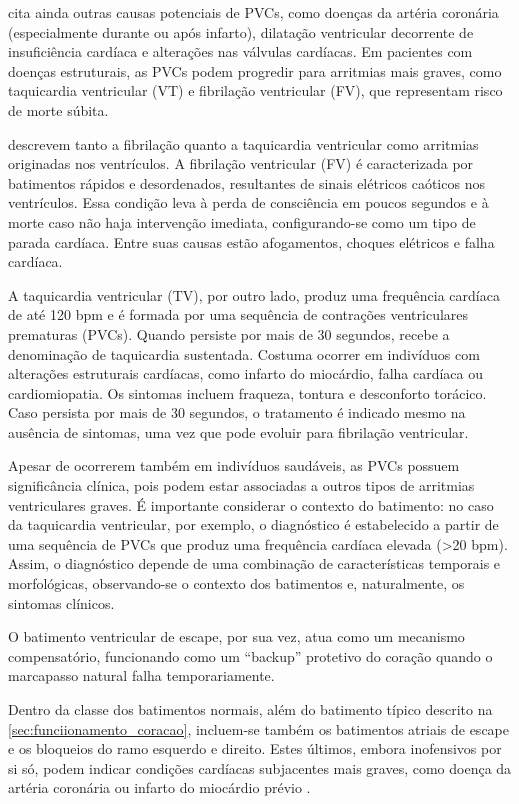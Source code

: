  cita ainda outras causas potenciais de PVCs, como doenças da artéria coronária (especialmente durante ou após infarto), dilatação ventricular decorrente de insuficiência cardíaca e alterações nas válvulas cardíacas. Em pacientes com doenças estruturais, as PVCs podem progredir para arritmias mais graves, como taquicardia ventricular (VT) e fibrilação ventricular (FV), que representam risco de morte súbita.

 descrevem tanto a fibrilação quanto a taquicardia ventricular como arritmias originadas nos ventrículos.
A fibrilação ventricular (FV) é caracterizada por batimentos rápidos e desordenados, resultantes de sinais elétricos caóticos nos ventrículos. Essa condição leva à perda de consciência em poucos segundos e à morte caso não haja intervenção imediata, configurando-se como um tipo de parada cardíaca. Entre suas causas estão afogamentos, choques elétricos e falha cardíaca.

A taquicardia ventricular (TV), por outro lado, produz uma frequência cardíaca de até 120 bpm e é formada por uma sequência de contrações ventriculares prematuras (PVCs). Quando persiste por mais de 30 segundos, recebe a denominação de taquicardia sustentada. Costuma ocorrer em indivíduos com alterações estruturais cardíacas, como infarto do miocárdio, falha cardíaca ou cardiomiopatia. Os sintomas incluem fraqueza, tontura e desconforto torácico. Caso persista por mais de 30 segundos, o tratamento é indicado mesmo na ausência de sintomas, uma vez que pode evoluir para fibrilação ventricular.

Apesar de ocorrerem também em indivíduos saudáveis, as PVCs possuem significância clínica, pois podem estar associadas a outros tipos de arritmias ventriculares graves. É importante considerar o contexto do batimento: no caso da taquicardia ventricular, por exemplo, o diagnóstico é estabelecido a partir de uma sequência de PVCs que produz uma frequência cardíaca elevada (>20 bpm). Assim, o diagnóstico depende de uma combinação de características temporais e morfológicas, observando-se o contexto dos batimentos e, naturalmente, os sintomas clínicos.

O batimento ventricular de escape, por sua vez, atua como um mecanismo compensatório, funcionando como um “backup” protetivo do coração quando o marcapasso natural falha temporariamente.

Dentro da classe dos batimentos normais, além do batimento típico descrito na \ref{sec:funciionamento_coracao}, incluem-se também os batimentos atriais de escape e os bloqueios do ramo esquerdo e direito. Estes últimos, embora inofensivos por si só, podem indicar condições cardíacas subjacentes mais graves, como doença da artéria coronária ou infarto do miocárdio prévio \cite{mitchell2024hisbloqueio}.

